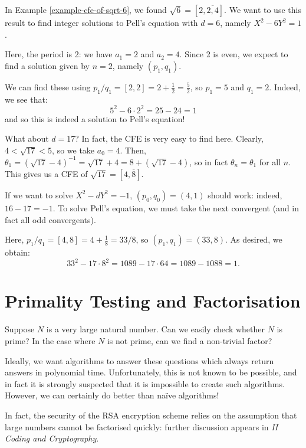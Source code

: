 \documentclass{article}
\begin{document}
\begin{example}
    In Example \ref{example-cfe-of-sqrt-6}, we found $\sqrt 6 = [2, \overline{2, 4}]$. We want to use this result to find integer solutions to Pell's equation with $d = 6$, namely $X^2 - 6Y^2 = 1$.
    
    Here, the period is 2: we have $a_1 = 2$ and $a_2 = 4$. Since 2 is even, we expect to find a solution given by $n = 2$, namely $(p_1, q_1)$.
    
    We can find these using $p_1/q_1 = [2, 2] = 2 + \frac{1}{2} = \frac{5}{2}$, so $p_1 = 5$ and $q_1 = 2$. Indeed, we see that:
    \[
	5^2 - 6 \cdot 2^2 = 25 - 24 = 1
	\]
	and so this is indeed a solution to Pell's equation!
	
	What about $d = 17$? In fact, the CFE is very easy to find here. Clearly, $4 < \sqrt{17} < 5$, so we take $a_0 = 4$. Then, $\theta_1 = (\sqrt{17} - 4)^{-1} = \sqrt{17} + 4 = 8 + (\sqrt{17} - 4)$, so in fact $\theta_n = \theta_1$ for all $n$. This gives us a CFE of $\sqrt{17} = [4, \overline 8]$.
	
	If we want to solve $X^2 - dY^2 = -1$, $(p_0, q_0) = (4, 1)$ should work: indeed, $16 - 17 = -1$. To solve Pell's equation, we must take the next convergent (and in fact all odd convergents).
	
	Here, $p_1/q_1 = [4, 8] = 4 + \frac{1}{8} = 33/8$, so $(p_1, q_1) = (33, 8)$. As desired, we obtain:
	\[
	33^2 - 17 \cdot 8^2 = 1089 - 17 \cdot 64 = 1089 - 1088 = 1.
	\]
\end{example}


\pagebreak
\section{Primality Testing and Factorisation}
\label{subsection-primality-testing}

Suppose $N$ is a very large natural number. Can we easily check whether $N$ is prime? In the case where $N$ is not prime, can we find a non-trivial factor?

Ideally, we want algorithms to answer these questions which always return answers in polynomial time. Unfortunately, this is not known to be possible, and in fact it is strongly suspected that it is impossible to create such algorithms. However, we can certainly do better than na\"ive algorithms!

\begin{note}
	In fact, the security of the RSA encryption scheme relies on the assumption that large numbers cannot be factorised quickly: further discussion appears in \textit{II Coding and Cryptography}.
\end{note}
\end{document}
